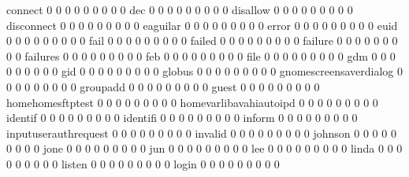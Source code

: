 \documentclass[compress,8pt]{beamer}
\begin{document}
\begin{frame}
\begin{Schunk}
  connect                                    0   0   0   0   0   0   0   0   0
  dec                                        0   0   0   0   0   0   0   0   0
  disallow                                   0   0   0   0   0   0   0   0   0
  disconnect                                 0   0   0   0   0   0   0   0   0
  eaguilar                                   0   0   0   0   0   0   0   0   0
  error                                      0   0   0   0   0   0   0   0   0
  euid                                       0   0   0   0   0   0   0   0   0
  fail                                       0   0   0   0   0   0   0   0   0
  failed                                     0   0   0   0   0   0   0   0   0
  failure                                    0   0   0   0   0   0   0   0   0
  failures                                   0   0   0   0   0   0   0   0   0
  feb                                        0   0   0   0   0   0   0   0   0
  file                                       0   0   0   0   0   0   0   0   0
  gdm                                        0   0   0   0   0   0   0   0   0
  gid                                        0   0   0   0   0   0   0   0   0
  globus                                     0   0   0   0   0   0   0   0   0
  gnomescreensaverdialog                     0   0   0   0   0   0   0   0   0
  groupadd                                   0   0   0   0   0   0   0   0   0
  guest                                      0   0   0   0   0   0   0   0   0
  homehomesftptest                           0   0   0   0   0   0   0   0   0
  homevarlibavahiautoipd                     0   0   0   0   0   0   0   0   0
  identif                                    0   0   0   0   0   0   0   0   0
  identifi                                   0   0   0   0   0   0   0   0   0
  inform                                     0   0   0   0   0   0   0   0   0
  inputuserauthrequest                       0   0   0   0   0   0   0   0   0
  invalid                                    0   0   0   0   0   0   0   0   0
  johnson                                    0   0   0   0   0   0   0   0   0
  jone                                       0   0   0   0   0   0   0   0   0
  jun                                        0   0   0   0   0   0   0   0   0
  lee                                        0   0   0   0   0   0   0   0   0
  linda                                      0   0   0   0   0   0   0   0   0
  listen                                     0   0   0   0   0   0   0   0   0
  login                                      0   0   0   0   0   0   0   0   0

\end{Schunk}
\end{frame}
\end{document}
